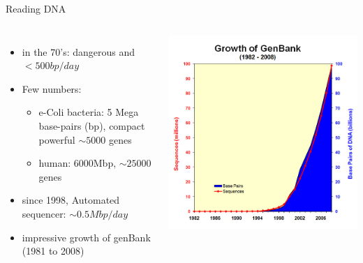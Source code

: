 \begin{frame}{Reading DNA}
\footnotesize

    \begin{columns}[c] %
\begin{itemize}
\item in the 70's: dangerous and $<500bp/day$
\item Few numbers:
  \begin{itemize}
\footnotesize
  \item e-Coli bacteria: 5 Mega base-pairs (bp), compact powerful $\sim 5000$ genes
  \item human: 6000Mbp, $\sim 25000$ genes
  \end{itemize} 
\item since 1998, Automated sequencer: $\sim 0.5Mbp/day$
\item impressive growth of genBank (1981 to 2008)
\end{itemize} 
      \includegraphics[width=1.0\textwidth]{./images/genbankgrowth.jpg} 
    \end{columns}
\end{frame}
